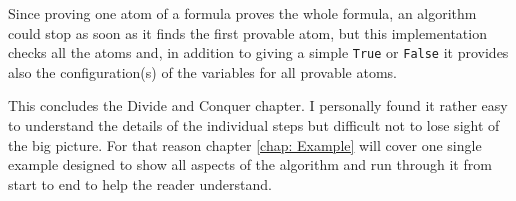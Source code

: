 Since proving one atom of a formula proves the whole formula, an algorithm could stop as soon as it finds the first provable atom, but this implementation checks all the atoms and, in addition to giving a simple \texttt{True} or \texttt{False} it provides also the configuration(s) of the variables for all provable atoms.


\bigskip
\par This concludes the Divide and Conquer chapter. I personally found it rather easy to understand the details of the individual steps but difficult not to lose sight of the big picture. For that reason chapter \ref{chap: Example} will cover one single example designed to show all aspects of the algorithm and run through it from start to end to help the reader understand.

